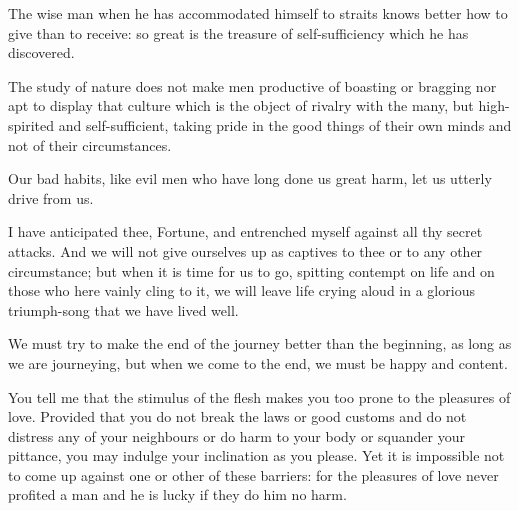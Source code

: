 \documentclass{stex}
\begin{document}
\vspace{0.5em}
\begin{sparagraph}[title=44]
  The wise man when he has accommodated himself to straits knows better how to give than to receive: so great is the treasure of self-sufficiency which he has discovered.
\end{sparagraph}
\vspace{0.5em}
\begin{sparagraph}[title=45]
  The study of nature does not make men productive of boasting or bragging nor apt to display that culture which is the object of rivalry with the many, but high-spirited and self-sufficient, taking pride in the good things of their own minds and not of their circumstances.
\end{sparagraph}
\vspace{0.5em}
\begin{sparagraph}[title=46]
  Our bad habits, like evil men who have long done us great harm, let us utterly drive from us.
\end{sparagraph}
\vspace{0.5em}
\begin{sparagraph}[title=47]
  I have anticipated thee, Fortune, and entrenched myself against all thy secret attacks.
  And we will not give ourselves up as captives to thee or to any other circumstance; but when it is time for us to go, spitting contempt on life and on those who here vainly cling to it, we will leave life crying aloud in a glorious triumph-song that we have lived well.
\end{sparagraph}
\vspace{0.5em}
\begin{sparagraph}[title=48]
  We must try to make the end of the journey better than the beginning, as long as we are journeying, but when we come to the end, we must be happy and content.
\end{sparagraph}
\vspace{0.5em}
\begin{sparagraph}[title=51]
  You tell me that the stimulus of the flesh makes you too prone to the pleasures of love.
  Provided that you do not break the laws or good customs and do not distress any of your neighbours or do harm to your body or squander your pittance, you may indulge your inclination as you please.
  Yet it is impossible not to come up against one or other of these barriers: for the pleasures of love never profited a man and he is lucky if they do him no harm.
\end{sparagraph}
\end{document}
